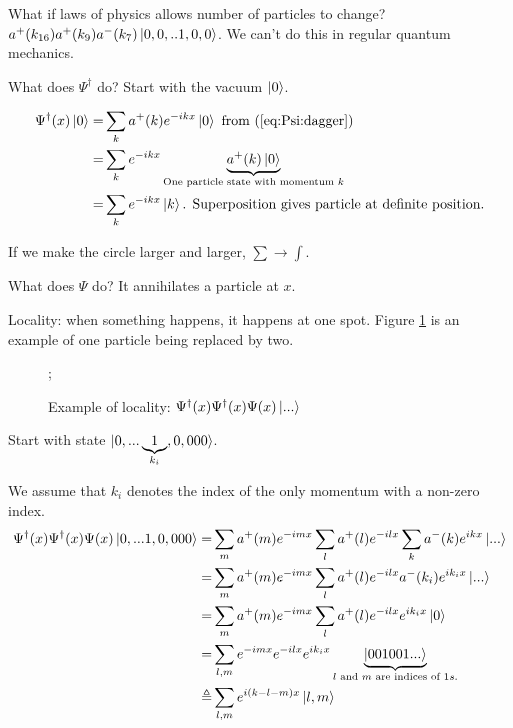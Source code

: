 \documentclass[]{article}
\begin{document}
What if laws of physics allows number of particles to change? $a^+(k_{16})a^+(k_9)a^-(k_7)\ket{0,0,..1,0,0}$. We can't do this in regular quantum mechanics.

What does $\Psi^\dagger$ do? Start with the vacuum $\ket{0}$.

\begin{align*}
	\Psi^\dagger(x)\ket{0} =& \sum_k a^+(k) e^{-ikx} \ket{0} \text{ from (\ref{eq:Psi:dagger})}\\
	=& \sum_k e^{-ikx} \underbrace{a^+(k) \ket{0}}_\text{One particle state with momentum $k$} \\
	=& \sum_k e^{-ikx} \ket{k} \text{. Superposition gives particle at definite position.}
\end{align*}

If we make the circle larger and larger, $\sum \rightarrow \int$.

What does $\Psi$ do? It annihilates a particle at $x$.

Locality: when something happens, it happens at one spot. Figure \ref{fig:ex:locality} is an example of one particle being replaced by two.

\begin{figure}[H]
	\caption[Example of locality: one particle is replaced by two]{Example of locality: $\Psi^\dagger(x)\Psi^\dagger(x)\Psi(x)\ket{...}$}\label{fig:ex:locality}
	\begin{center}
		;
	\end{center}
\end{figure}



Start with state $\ket{0,...\underbrace{1}_\text{$k_i$},0,000}$.

We assume that $k_i$ denotes the index of the only momentum with a non-zero index.
\begin{align*}
\Psi^\dagger(x)\Psi^\dagger(x)\Psi(x)\ket{0,...1,0,000}=&\sum_m a^+(m) e^{-imx} \sum_l a^+(l) e^{-ilx} \sum_k a^-(k) e^{ikx} \ket{...}\\
=&\sum_m a^+(m) e^{-imx} \sum_l a^+(l) e^{-ilx} a^-(k_i) e^{ik_ix} \ket{...}\\
=&\sum_m a^+(m) e^{-imx} \sum_l a^+(l) e^{-ilx}  e^{ik_ix} \ket{0}\\
=&\sum_{l,m}  e^{-imx}  e^{-ilx}  e^{ik_ix} \underbrace{\ket{001001...}}_\text{$l$ and $m$ are indices of $1s$.}\\
\triangleq &\sum_{l,m}   e^{i(k-l-m)x} \ket{l,m}
\end{align*}
\end{document}
